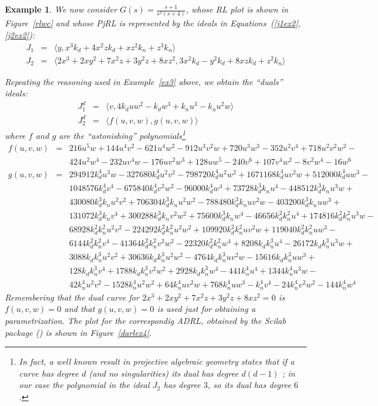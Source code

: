 \documentclass{article}
\newtheorem{example}{Example}[section]
\begin{document}
\begin{example} \em \label{ex4} We now consider $\displaystyle G(s)=\frac{s+1}{s^2(s+4)}$, 
whose RL plot is shown in Figure~\ref{rlwc} and whose PjRL is represented by the ideals 
in Equations~(\ref{j1ex2},\ref{j2ex2}):
\begin{eqnarray*}
J_1 & = & \langle y, x^3k_d + 4x^2zk_d + xz^2k_n + z^3k_n\rangle \\
J_2 & = & \langle 2x^3 + 2xy^2 + 7x^2z + 3y^2z + 8xz^2, 3x^2k_d - y^2k_d + 8xzk_d + z^2k_n\rangle
\end{eqnarray*}

Repeating the reasoning used in Example~\ref{ex3} above, we obtain the ``duals'' ideals:
\begin{eqnarray}
J_1^d & = & \langle v,4k_duw^2 - k_dw^3 + k_nu^3- k_nu^2w\rangle \label{j1dex4}\\
J_2^d & = & \langle f(u,v,w), g(u,v,w)\rangle \label{j2dex4}
\end{eqnarray}
where $f$ and $g$ are the ``astonishing'' polynomials\footnote{In fact, a well known result in projective algebraic geometry
states that if a curve has degree $d$ (and no singularities) its dual has degree $d(d-1)$ \cite[pp.~173]{gray}; 
in our case the polynomial in the ideal $J_2$ has degree $3$, so its dual has degree $6$.}
\begin{eqnarray*}
f(u,v,w) & = & 216u^5w+144u^4v^2-621u^4w^2-912u^3v^2w+720u^3w^3-352u^2v^4+718u^2v^2w^2 - \\
         &   & 424u^2w^4 -232uv^4w-176uv^2w^3+128uw^5-240v^6+107v^4w^2-8v^2w^4-16w^6 \\
g(u,v,w) & = & 294912k_d^4u^3w-327680k_d^4u^2v^2-798720k_d^4u^2w^2+1671168k_d^4uv^2w+512000k_d^4uw^3-\\
              &    & 1048576k_d^4v^4-675840k_d^4v^2w^2-96000k_d^4w^4+73728k_d^3k_nu^4-448512k_d^3k_nu^3w+\\
              &    & 430080k_d^3k_nu^2v^2+706304k_d^3k_nu^2w^2-788480k_d^3k_nuv^2w-403200k_d^3k_nuw^3+ \\
              &    & 131072k_d^3k_nv^4+300288k_d^3k_nv^2w^2+75600k_d^3k_nw^4-46656k_d^2k_n^2u^4+174816k_d^2k_n^2u^3w-\\
              &    & 68928k_d^2k_n^2u^2v^2-224292k_d^2k_n^2u^2w^2+109920k_d^2k_n^2uv^2w+119040k_d^2k_n^2uw^3- \\
              &    & 6144k_d^2k_n^2v^4-41364k_d^2k_n^2v^2w^2-22320k_d^2k_n^2w^4+8208k_dk_n^3u^4-26172k_dk_n^3u^3w+\\ 
              &    & 3088k_dk_n^3u^2v^2+30636k_dk_n^3u^2w^2-4764k_dk_n^3uv^2w-15616k_dk_n^3uw^3+ \\
              &    & 128k_dk_n^3v^4+1788k_dk_n^3v^2w^2+2928k_dk_n^3w^4-441k_n^4u^4+1344k_n^4u^3w- \\
              &    & 42k_n^4u^2v^2-1528k_n^4u^2w^2+64k_n^4uv^2w+768k_n^4uw^3-k_n^4v^4-24k_n^4v^2w^2-144k_n^4w^4
\end{eqnarray*}
Remembering that the dual curve for $2x^3 + 2xy^2 + 7x^2z + 3y^2z + 8xz^2=0$ is $f(u,v,w)=0$ and
that $g(u,v,w)=0$ is used just for obtaining a parametrization. The plot for the correspondig ADRL, 
obtained by the Scilab package (\cite{scilab}) is shown in Figure~\ref{darlex4}.



\end{example}
\end{document}
